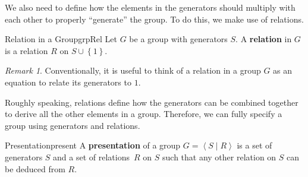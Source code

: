 \documentclass[math]{amznotes}
\theoremstyle{remark}
\newtheorem*{remark}{Remark}
\newcommand{\0}{\mathbf{0}}
\newcommand{\1}{\mathbf{1}}
\begin{document}
We also need to define how the elements in the generators should multiply with each other to properly ``generate'' the group. To do this, we make use of relations.
\begin{dfnbox}{Relation in a Group}{grpRel}
    Let $G$ be a group with generators $S$. A {\color{red} \textbf{relation}} in $G$ is a relation $R$ on $S \cup \left\{1\right\}$.
\end{dfnbox}
\begin{notebox}
    \begin{remark}
        Conventionally, it is useful to think of a relation in a group $G$ as an equation to relate its generators to $1$.
    \end{remark}
\end{notebox}
Roughly speaking, relations define how the generators can be combined together to derive all the other elements in a group. Therefore, we can fully specify a group using generators and relations.
\begin{dfnbox}{Presentation}{present}
    A {\color{red} \textbf{presentation}} of a group $G = \left\langle S \mid R\right\rangle$ is a set of generators $S$ and a set of relations~$R$ on $S$ such that any other relation on $S$ can be deduced from $R$.
\end{dfnbox}
\end{document}
